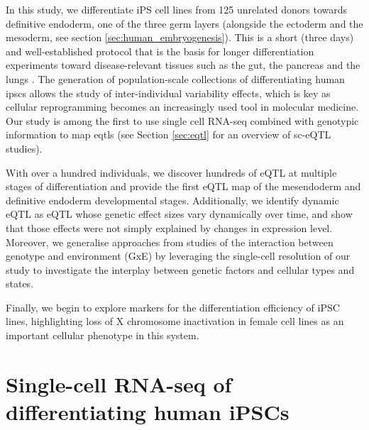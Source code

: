 In this study, we differentiate iPS cell lines from 125 unrelated donors towards definitive endoderm, one of the three germ layers (alongside the ectoderm and the mesoderm, see section \ref{sec:human_embryogenesis}). 
This is a short (three days) and well-established protocol \cite{hannan2013production} that is the basis for longer differentiation experiments toward disease-relevant tissues such as the gut, the pancreas and the lungs \cite{}.
The generation of population-scale collections of differentiating human \gls{ipsc}s allows the study of inter-individual variability effects, which is key as cellular reprogramming becomes an increasingly used tool in molecular medicine.\\

Our study is among the first to use single cell RNA-seq combined with genotypic information to map \glspl{eqtl} (see Section \ref{sec:eqtl} for an overview of sc-eQTL studies).

With over a hundred individuals, we discover hundreds of eQTL at multiple stages of differentiation and provide the first eQTL map of the mesendoderm and definitive endoderm developmental stages.
Additionally, we identify dynamic eQTL as eQTL whose genetic effect sizes vary dynamically over time, and show that those effects were not simply explained by changes in expression level. 
Moreover, we generalise approaches from studies of the interaction between genotype and environment (GxE) by leveraging the single-cell resolution of our study to investigate the interplay between genetic factors and cellular types and states.

Finally, we begin to explore markers for the differentiation efficiency of iPSC lines, highlighting loss of X chromosome inactivation in female cell lines as an important cellular phenotype in this system.

\newpage

\section{Single-cell RNA-seq of differentiating human iPSCs}

